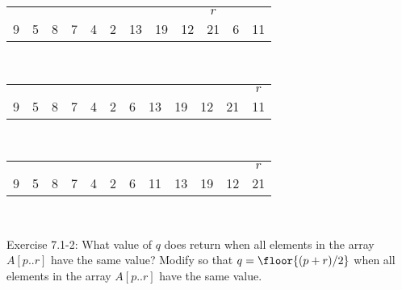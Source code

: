 \documentclass[addpoints,11pt]{exam}
\begin{document}
\begin{questions}
\begin{solutionorbox}
\begin{tabular}{|c|c|c|c|c|c|c|c|c|c|c|c|}
				\multicolumn{1}{c}{}&
				\multicolumn{1}{c}{}&
				\multicolumn{1}{c}{}&
				\multicolumn{1}{c}{}&
				\multicolumn{1}{c}{}&
				\multicolumn{1}{c}{}&
				\multicolumn{1}{c}{}&
				\multicolumn{1}{c}{}&
				\multicolumn{1}{c}{}&
				\multicolumn{1}{c}{$r$}\\
				\cellcolor{lightred}9&
				\cellcolor{lightred}5&
				\cellcolor{lightred}8&
				\cellcolor{lightred}7&
				\cellcolor{lightred}4&
				\cellcolor{lightred}2&
				\cellcolor{lightred}13&
				\cellcolor{lightred}19&
				\cellcolor{lightred}12&
				\cellcolor{lightred}21&
				6&
				11
			\end{tabular}\\
			\begin{tabular}{|c|c|c|c|c|c|c|c|c|c|c|c|}
				\multicolumn{1}{c}{}&
				\multicolumn{1}{c}{}&
				\multicolumn{1}{c}{}&
				\multicolumn{1}{c}{}&
				\multicolumn{1}{c}{}&
				\multicolumn{1}{c}{}&
				\multicolumn{1}{c}{}&
				\multicolumn{1}{c}{}&
				\multicolumn{1}{c}{}&
				\multicolumn{1}{c}{}&
				\multicolumn{1}{c}{}&
				\multicolumn{1}{c}{$r$}\\
				\cellcolor{lightred}9&
				\cellcolor{lightred}5&
				\cellcolor{lightred}8&
				\cellcolor{lightred}7&
				\cellcolor{lightred}4&
				\cellcolor{lightred}2&
				\cellcolor{lightred}6&
				\cellcolor{lightred}13&
				\cellcolor{lightred}19&
				\cellcolor{lightred}12&
				\cellcolor{lightred}21&
				11
			\end{tabular}\\
			\begin{tabular}{|c|c|c|c|c|c|c|c|c|c|c|c|}
				\multicolumn{1}{c}{}&
				\multicolumn{1}{c}{}&
				\multicolumn{1}{c}{}&
				\multicolumn{1}{c}{}&
				\multicolumn{1}{c}{}&
				\multicolumn{1}{c}{}&
				\multicolumn{1}{c}{}&
				\multicolumn{1}{c}{}&
				\multicolumn{1}{c}{}&
				\multicolumn{1}{c}{}&
				\multicolumn{1}{c}{}&
				\multicolumn{1}{c}{$r$}\\
				\cellcolor{lightred}9&
				\cellcolor{lightred}5&
				\cellcolor{lightred}8&
				\cellcolor{lightred}7&
				\cellcolor{lightred}4&
				\cellcolor{lightred}2&
				\cellcolor{lightred}6&
				11&
				\cellcolor{lightred}13&
				\cellcolor{lightred}19&
				\cellcolor{lightred}12&
				\cellcolor{lightred}21
			\end{tabular}\\
		\end{solutionorbox}
		
		\ifprintanswers
		\newpage
		\else
		\bigskip
		\fi
		
		
		\question[5]
		Exercise 7.1-2: What value of $q$ does  return when all elements in the array $A[p..r]$ have the same value?  Modify  so that $q= \floor{(p+r)/2}$ when all elements in the array $A[p..r]$ have the same value.
		

\end{questions}
\end{document}
